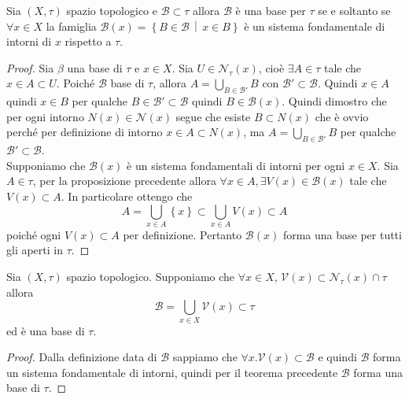 \begin{theorem}
	Sia $(X,\tau)$ spazio topologico e $\mathcal{B} \subset \tau$ allora $\mathcal{B}$ è una base per $\tau$ se e soltanto se $\forall x \in X$ la famiglia $\mathcal{B}(x) = \left\{B \in \mathcal{B} \,\middle|\, x \in B \right\}$ è un sistema fondamentale di intorni di $x$ rispetto a $\tau$.
\end{theorem}
\begin{proof}
	Sia $\beta$ una base di $\tau$ e $x \in X$. Sia $U \in \mathcal{N}_\tau(x)$, cioè $\exists A \in \tau$ tale che $x \in A \subset U$. Poiché $\mathcal{B}$ base di $\tau$, allora $A = \bigcup_{B \in \mathcal{B}'} B$ con $\mathcal{B}' \subset \mathcal{B}$. Quindi $x \in A$ quindi $x \in B$ per qualche $B \in \mathcal{B}' \subset \mathcal{B}$ quindi $B \in \mathcal{B}(x)$. Quindi dimostro che per ogni intorno $N(x) \in \mathcal{N}(x)$ segue che esiste $B \subset N(x)$ che è ovvio perché per definizione di intorno $x \in A \subset N(x)$, ma $A = \bigcup_{B \in \mathcal{B}'} B$ per qualche $\mathcal{B}' \subset \mathcal{B}$.\\  
	
	Supponiamo che $\mathcal{B}(x)$ è un sistema fondamentali di intorni per ogni $x \in X$. Sia $A \in \tau$, per la proposizione precedente allora $\forall x \in A, \exists V(x) \in \mathcal{B}(x)$ tale che $V(x) \subset A$. In particolare ottengo che
	\begin{equation*}
		A = \bigcup_{x \in A} \left\{x\right\} \subset \bigcup_{x \in A} V(x) \subset A
	\end{equation*} 
	poiché ogni $V(x) \subset A$ per definizione. Pertanto $\mathcal{B}(x)$ forma una base per tutti gli aperti in $\tau$.
\end{proof}

\begin{corollary}
	\label{crl:base_from_sfi}
	Sia $(X,\tau)$ spazio topologico. Supponiamo che $\forall x \in X$, $\mathcal{V}(x) \subset \mathcal{N}_\tau(x) \cap \tau$ allora 
	\begin{equation*}
		\mathcal{B} = \bigcup_{x \in X} \mathcal{V}(x) \subset \tau
	\end{equation*}
	ed è una base di $\tau$.
\end{corollary}
\begin{proof}
	Dalla definizione data di $\mathcal{B}$ sappiamo che $\forall x . \mathcal{V}(x) \subset \mathcal{B}$ e quindi $\mathcal{B}$ forma un sistema fondamentale di intorni, quindi per il teorema precedente $\mathcal{B}$ forma una base di $\tau$.
\end{proof}

